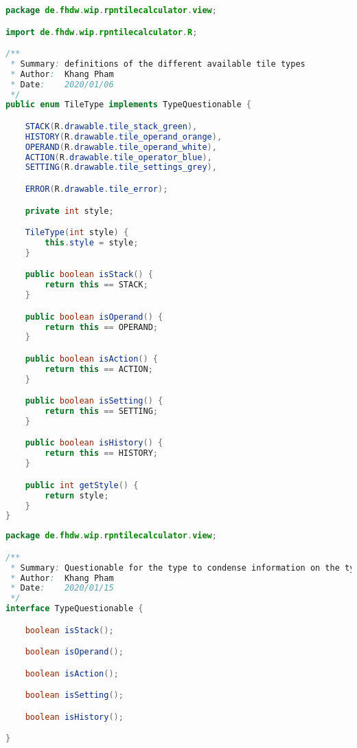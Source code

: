 \begin{lstlisting}[caption=TileType,label=list:TileType,language=Java]
package de.fhdw.wip.rpntilecalculator.view;

import de.fhdw.wip.rpntilecalculator.R;

/**
 * Summary: definitions of the different available tile types
 * Author:  Khang Pham
 * Date:    2020/01/06
 */
public enum TileType implements TypeQuestionable {

    STACK(R.drawable.tile_stack_green),
    HISTORY(R.drawable.tile_operand_orange),
    OPERAND(R.drawable.tile_operand_white),
    ACTION(R.drawable.tile_operator_blue),
    SETTING(R.drawable.tile_settings_grey),

    ERROR(R.drawable.tile_error);

    private int style;

    TileType(int style) {
        this.style = style;
    }

    public boolean isStack() {
        return this == STACK;
    }

    public boolean isOperand() {
        return this == OPERAND;
    }

    public boolean isAction() {
        return this == ACTION;
    }

    public boolean isSetting() {
        return this == SETTING;
    }

    public boolean isHistory() {
        return this == HISTORY;
    }

    public int getStyle() {
        return style;
    }
}
\end{lstlisting}    

\begin{lstlisting}[caption=TypeQuestionable,label=list:TypeQuestionable,language=Java]
package de.fhdw.wip.rpntilecalculator.view;

/**
 * Summary: Questionable for the type to condense information on the type
 * Author:  Khang Pham
 * Date:    2020/01/15
 */
interface TypeQuestionable {

    boolean isStack();

    boolean isOperand();

    boolean isAction();

    boolean isSetting();

    boolean isHistory();

}
\end{lstlisting}    

